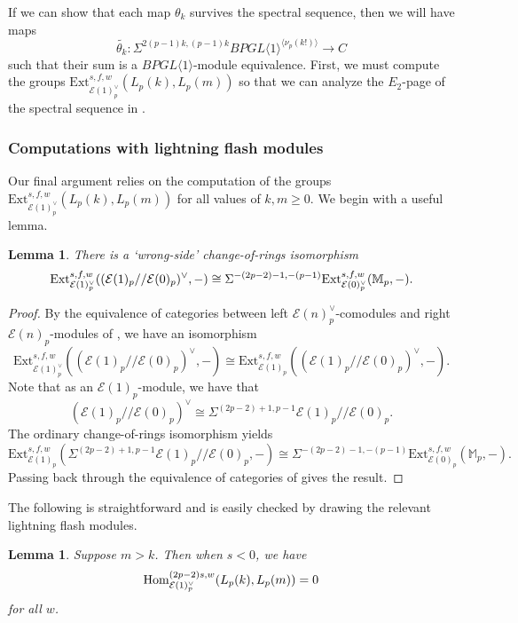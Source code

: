 \documentclass{amsart}
\newtheorem{lemma}[theorem]{Lemma}
\theoremstyle{plain}
\numberwithin{theorem}{section}
\numberwithin{equation}{section}
\numberwithin{figure}{section}
\newcommand{\0}{\langle 0 \rangle }
\begin{document}
If we can show that each map $\theta_k$ survives the spectral sequence, then we will have maps \[\widetilde{\theta_k}:\Sigma^{2(p-1)k, (p-1)k}BPGL\langle 1 \rangle^{\langle \nu_p(k!) \rangle} \to C\] such that their sum is a $BPGL\langle 1 \rangle$-module equivalence. First, we must compute the groups $\text{Ext}^{s,f,w}_{\mathcal{E}(1)^\vee_p}\left(L_p(k), L_p(m)\right)$ so that we can analyze the $E_2$-page of the spectral sequence in .

\subsubsection{Computations with lightning flash modules} Our final argument relies on the computation of the groups $\text{Ext}_{\mathcal{E}(1)_p^\vee}^{s,f,w}(L_p(k), L_p(m))$ for all values of $k, m \geq 0$. We begin with a useful lemma.

\begin{lemma}
\label{lemma:WrongSide}
    There is a `wrong-side' change-of-rings isomorphism
    \[\textup{Ext}_{\mathcal{E}(1)_p^\vee}^{s,f,w}((\mathcal{E}(1)_p//\mathcal{E}(0)_p)^\vee, -) \cong \Sigma^{-(2p-2)-1, -(p-1)}\textup{Ext}^{s,f,w}_{\mathcal{E}(0)_p^\vee}(\mathbb{M}_p, -).\]
\end{lemma}

\begin{proof}
    By the equivalence of categories between left $\mathcal{E}(n)^\vee_p$-comodules and right $\mathcal{E}(n)_p$-modules of , we have an isomorphism
    \[\text{Ext}^{s,f,w}_{\mathcal{E}(1)^\vee_p}((\mathcal{E}(1)_p//\mathcal{E}(0)_p)^\vee, -) \cong \text{Ext}^{s,f,w}_{\mathcal{E}(1)_p}((\mathcal{E}(1)_p//\mathcal{E}(0)_p)^\vee, -).\]
    Note that as an $\mathcal{E}(1)_p$-module, we have that
    \[(\mathcal{E}(1)_p//\mathcal{E}(0)_p)^\vee \cong \Sigma^{(2p-2)+1, p-1}\mathcal{E}(1)_p//\mathcal{E}(0)_p.\]
    The ordinary change-of-rings isomorphism yields
    \[\text{Ext}^{s,f,w}_{\mathcal{E}(1)_p}(\Sigma^{(2p-2)+1, p-1}\mathcal{E}(1)_p//\mathcal{E}(0)_p, -) \cong \Sigma^{-(2p-2)-1, -(p-1)}\text{Ext}^{s,f,w}_{\mathcal{E}(0)_p}(\mathbb{M}_p, -).\]
    Passing back through the equivalence of categories of  gives the result.
\end{proof}

The following is straightforward and is easily checked by drawing the relevant lightning flash modules. 
\begin{lemma}
\label{lemma:HomLightning}
    Suppose $m > k$. Then when $s<0$, we have 
    \[\textup{Hom}^{(2p-2)s, w}_{\mathcal{E}(1)^\vee_p}(L_p(k), L_p(m))=0\]
    for all $w$.
\end{lemma}
\end{document}
